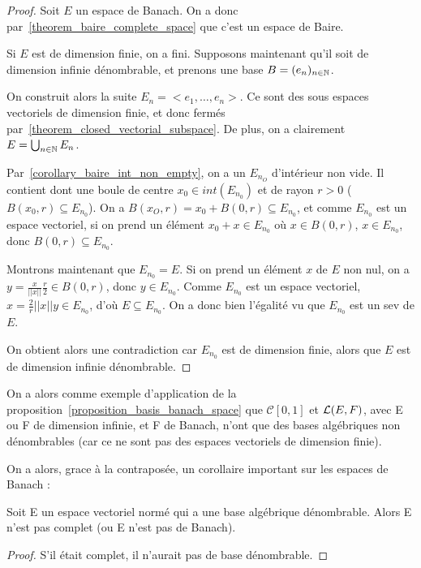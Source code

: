 \ifdefined\outputproof
\begin{proof}
	Soit $E$ un espace de Banach. On a donc
	par~\ref{theorem_baire_complete_space} que c'est un espace de Baire.

	Si $E$ est de dimension finie, on a fini.
	Supposons maintenant qu'il soit de dimension infinie dénombrable, et prenons
	une base $B = (e_{n})_{n \in \mathbb{N}}$.

	On construit alors la suite $E_{n} = <e_{1}, \ldots, e_{n}>$. Ce sont des
	sous espaces vectoriels de dimension finie, et donc fermés
	par~\ref{theorem_closed_vectorial_subspace}. De plus, on a
	clairement $E = \bigcup_{n \in \mathbb{N}} E_{n}$.

	Par~\ref{corollary_baire_int_non_empty}, on a un $E_{n_{O}}$ d'intérieur non
	vide. Il contient dont une boule de centre $x_{0} \in int({E_{n_{0}}})$ et
	de rayon $r > 0$ ($B(x_{0}, r) \subseteq E_{n_{0}}$).
	On a $B(x_{O}, r) = x_{0} + B(0, r) \subseteq E_{n_{0}}$, et comme
	$E_{n_{0}}$ est un espace vectoriel, si on prend un élément $x_{0} + x \in
	E_{n_{0}}$ où $x \in B(0, r)$, $x \in E_{n_{0}}$, donc $B(0, r) \subseteq
	E_{n_{0}}$.

	Montrons maintenant que $E_{n_{0}} = E$. Si on prend un élément $x$ de $E$
	non nul, on a $y = \frac{x}{||x||} \frac{r}{2} \in B(0, r)$, donc $y \in
	E_{n_{0}}$. Comme $E_{n_{0}}$ est un espace vectoriel, $x = \frac{2}{r}
	||x|| y \in E_{n_{0}}$, d'où $E \subseteq E_{n_{0}}$. On a donc bien
	l'égalité vu que $E_{n_{0}}$ est un sev de $E$.

	On obtient alors une contradiction car $E_{n_{0}}$ est de dimension finie,
	alors que $E$ est de dimension infinie dénombrable.
\end{proof}
\fi

On a alors comme exemple d'application de la
proposition~\ref{proposition_basis_banach_space} que $\mathcal{C}[0, 1]$ et
$\mathcal{L}(E, F)$, avec E ou F de dimension infinie, et F de Banach,
n'ont que des bases algébriques non dénombrables (car ce ne sont pas des espaces
vectoriels de dimension finie).

On a alors, grace à la contraposée, un corollaire important sur les espaces de
Banach :

\begin{corollary}
	Soit E un espace vectoriel normé qui a une base algébrique dénombrable.
	Alors E n'est pas complet (ou E n'est pas de Banach).
\end{corollary}

\ifdefined\outputproof
\begin{proof}
	S'il était complet, il n'aurait pas de base dénombrable.
\end{proof}
\fi
